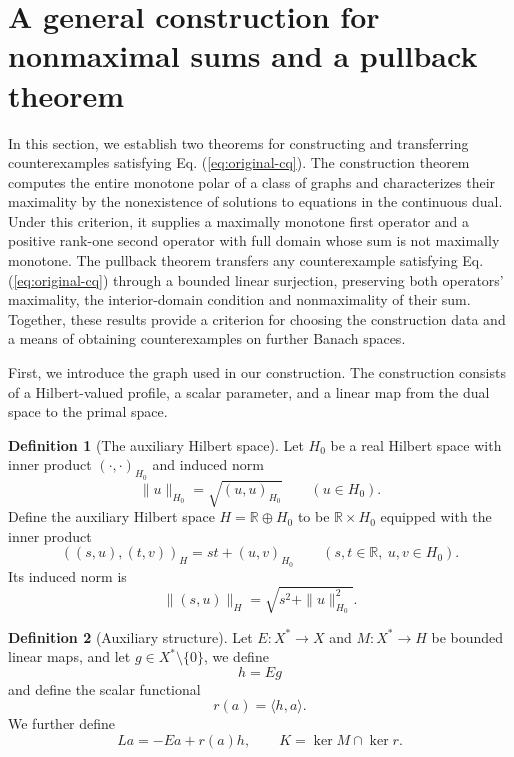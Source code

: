 \documentclass[11pt]{article}
\newcommand{\R}{\mathbb R}
\newcommand{\pair}[2]{\langle #1,#2\rangle}
\theoremstyle{definition}
\newtheorem{definition}{Definition}
\theoremstyle{remark}
\begin{document}
\section{A general construction for nonmaximal sums and a pullback theorem}
\label{sec:endpoint-criterion}

In this section, we establish two theorems for constructing and transferring counterexamples satisfying Eq. (\ref{eq:original-cq}). The construction theorem computes the entire monotone polar of a class of graphs and characterizes their maximality by the nonexistence of solutions to equations in the continuous dual. Under this criterion, it supplies a maximally monotone first operator and a positive rank-one second operator with full domain whose sum is not maximally monotone. The pullback theorem transfers any counterexample satisfying Eq. (\ref{eq:original-cq}) through a bounded linear surjection, preserving both operators' maximality, the interior-domain condition and nonmaximality of their sum. Together, these results provide a criterion for choosing the construction data and a means of obtaining counterexamples on further Banach spaces.






First, we introduce the graph used in our construction. The construction consists of a Hilbert-valued profile, a scalar parameter, and a linear map from the dual space to the primal space. 


\begin{definition}[The auxiliary Hilbert space]
\label{def:hilbert-spaces-norms}
Let $H_0$ be a real Hilbert space with inner product $(\cdot,\cdot)_{H_0}$ and induced norm
\[
\|u\|_{H_0}=\sqrt{(u,u)_{H_0}}\qquad(u\in H_0).
\]
Define the auxiliary Hilbert space $H=\R\oplus H_0$ to be $\R\times H_0$ equipped with the inner product
\[
((s,u),(t,v))_H=st+(u,v)_{H_0}
\qquad(s,t\in\R,\ u,v\in H_0).
\]
Its induced norm is
\[
\|(s,u)\|_H=\sqrt{s^2+\|u\|_{H_0}^2}.
\]
\end{definition}


\begin{definition}[Auxiliary structure]
\label{def:construction-maps}
Let $E:X^*\to X$ and $M:X^*\to H$ be bounded linear maps, and let
$g\in X^*\setminus\{0\}$, we define 
\[
h=Eg
\]
and define the scalar functional
\[
r(a)=\pair{h}{a}.
\]
We further define
\[
La=-Ea+r(a)h,
\qquad
K=\ker M\cap\ker r.
\]
\end{definition}

\end{document}
